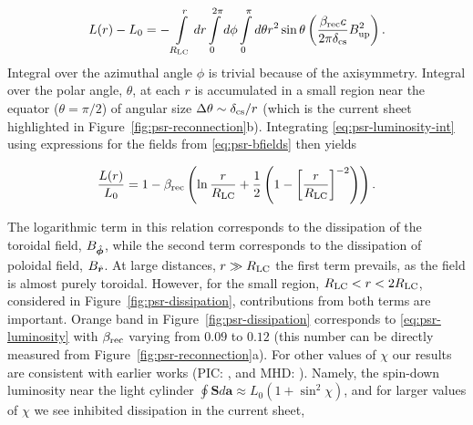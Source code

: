 \begin{equation}
\label{eq:psr-luminosity-int}
    L(r) - L_0 = -\int\limits_{R_{\rm LC}}^r dr\int\limits_0^{2\pi}d\phi \int\limits_0^\pi d\theta r^2\sin{\theta} \left(\frac{\beta_{\rm rec} c}{2\pi \delta_{\rm cs}}B_{\rm up}^2\right).
\end{equation}
\noindent Integral over the azimuthal angle $\phi$ is trivial because of the axisymmetry. Integral over the polar angle, $\theta$, at each $r$ is accumulated in a small region near the equator ($\theta=\pi/2$) of angular size $\Delta \theta\sim \delta_{\rm cs}/r$ (which is the current sheet highlighted in Figure~\ref{fig:psr-reconnection}b). Integrating \eqref{eq:psr-luminosity-int} using expressions for the fields from \eqref{eq:psr-bfields} then yields

\begin{equation}
\label{eq:psr-luminosity}
    \frac{L(r)}{L_0} = 1 - \beta_{\rm rec}\left(\ln{\frac{r}{R_{\rm LC}}}
    +\frac{1}{2}\left(1 -\left[\frac{r}{R_{\rm LC}}\right]^{-2}\right)\right).
\end{equation}

\noindent The logarithmic term in this relation corresponds to the dissipation of the toroidal field, $B_{\hat{\bm{\phi}}}$, while the second term corresponds to the dissipation of poloidal field, $B_{{\hat{\bm{r}}}}$. At large distances, $r\gg R_{\rm LC}$ the first term prevails, as the field is almost purely toroidal. However, for the small region, $R_{\rm LC}<r<2R_{\rm LC}$, considered in Figure~\ref{fig:psr-dissipation}, contributions from both terms are important. Orange band in Figure~\ref{fig:psr-dissipation} corresponds to \eqref{eq:psr-luminosity} with $\beta_{\rm rec}$ varying from $0.09$ to $0.12$ (this number can be directly measured from Figure~\ref{fig:psr-reconnection}a). For other values of $\chi$ our results are consistent with earlier works (PIC: \citealt{2015ApJ...801L..19P}, and MHD: \citealt{2013MNRAS.435L...1T}). Namely, the spin-down luminosity near the light cylinder $\oint \bm{S}d\bm{a}\approx L_0(1 + \sin^2{\chi})$, and for larger values of $\chi$ we see inhibited dissipation in the current sheet, 

